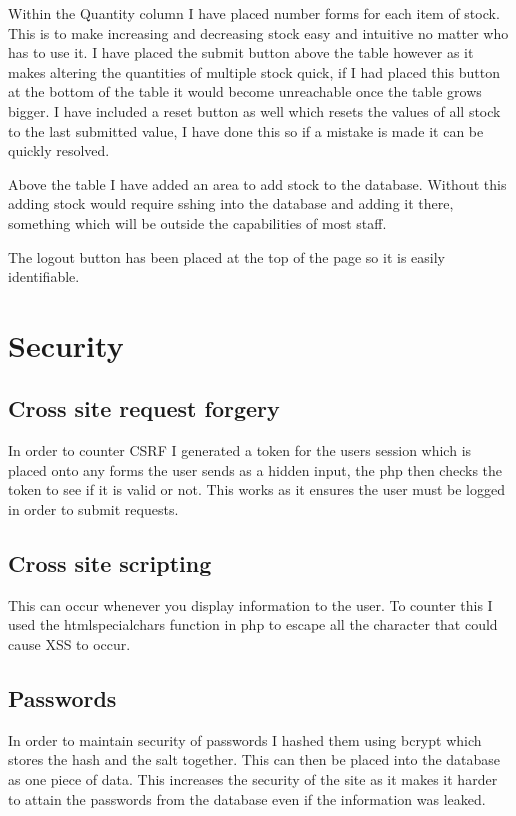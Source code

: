 \documentclass[10pt,a4paper]{report}
\begin{document}
	Within the Quantity column I have placed number forms for each item of stock. This is to make increasing and decreasing stock easy and intuitive no matter who has to use it. I have placed the submit button above the table however as it makes altering the quantities of multiple stock quick, if I had placed this button at the bottom of the table it would become unreachable once the table grows bigger. I have included a reset button as well which resets the values of all stock to the last submitted value, I have done this so if a mistake is made it can be quickly resolved.
	
	Above the table I have added an area to add stock to the database. Without this adding stock would require sshing into the database and adding it there, something which will be outside the capabilities of most staff.
	
	The logout button has been placed at the top of the page so it is easily identifiable.
	
	\newpage
	\section{Security}
	\subsection{Cross site request forgery}
	In order to counter CSRF I generated a token for the users session which is placed onto any forms the user sends as a hidden input, the php then checks the token to see if it is valid or not. This works as it ensures the user must be logged in order to submit requests.
	
	\subsection{Cross site scripting}
	This can occur whenever you display information to the user. To counter this I used the htmlspecialchars function in php to escape all the character that could cause XSS to occur.
	
	\subsection{Passwords}
	In order to maintain security of passwords I hashed them using bcrypt which stores the hash and the salt together. This can then be placed into the database as one piece of data. This increases the security of the site as it makes it harder to attain the passwords from the database even if the information was leaked.
\end{document}
